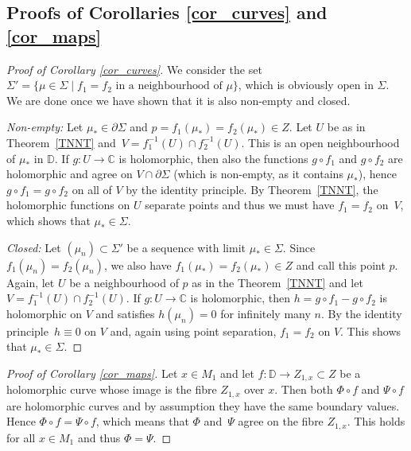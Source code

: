 \documentclass[pdftex]{sigma}
\numberwithin{equation}{section}
\theoremstyle{definition}
\newcommand{\C}{\mathbb{C}} %
\newcommand{\DD}{\mathbb{D}} %
\newcommand{\1}{{\bf 1}}
\begin{document}
\subsection[Proofs of Corollaries 1.5 and 1.6]{Proofs of Corollaries \ref{cor_curves} and \ref{cor_maps}}

\begin{proof}[Proof of Corollary \ref{cor_curves}]
	We consider the set $\Sigma'=\{\mu \in \Sigma\mid f_1 =f_2 \text{ in a neighbourhood of } \mu\}$,
which is obviously open in $\Sigma$. We are done once we have shown that it is also non-empty and closed.

{\it Non-empty:} Let $\mu_* \in \partial \Sigma$ and $p=f_1(\mu_*)=f_2(\mu_*)\in Z$. Let $U$ be as in Theorem~\ref{TNNT} and~${V=f_1^{-1}(U)\cap f_2^{-1}(U)}$. This is an open neighbourhood of $\mu_*$ in $\DD$. If $g\colon U\to \C$ is holomorphic, then also the functions $g\circ f_1$ and $g\circ f_2$ are holomorphic and agree on $V\cap \partial \Sigma$ (which is non-empty, as it contains $\mu_*$), hence $g\circ f_1 = g\circ f_2$ on all of $V$ by the identity principle. By Theorem~\ref{TNNT}, the holomorphic functions on $U$ separate points and thus we must have $f_1=f_2$ on~$V$, which shows that $\mu_*\in \Sigma$.

{\it Closed:} Let $(\mu_n)\subset \Sigma'$ be a sequence with limit $\mu_*\in \Sigma$. Since $f_1(\mu_n)=f_2(\mu_n)$, we also have $f_1(\mu_*)=f_2(\mu_*)\in Z$ and call this point $p$. Again, let $U$ be a neighbourhood of $p$ as in the Theorem~\ref{TNNT} and let $V=f_1^{-1}(U)\cap f_2^{-1}(U)$. If $g\colon U\to \C$ is holomorphic, then $h=g\circ f_1-g\circ f_2$ is holomorphic on $V$ and satisfies $h(\mu_n)=0$ for infinitely many $n$. By the identity principle~${h\equiv 0}$ on $V$ and, again using point separation, $f_1=f_2$ on $V$. This shows that $\mu_*\in \Sigma$.
\end{proof}


\begin{proof}[Proof of Corollary \ref{cor_maps}]
	Let $x\in M_1$ and let $f\colon \DD\rightarrow Z_{1,x}\subset Z$ be a holomorphic curve whose image is the fibre $Z_{1,x}$ over $x$. Then both $\Phi\circ f$ and $\Psi\circ f$ are holomorphic curves and by assumption they have the same boundary values. Hence $\Phi\circ f = \Psi\circ f$, which means that $\Phi$ and~$\Psi$ agree on the fibre $Z_{1,x}$. This holds for all $x\in M_1$ and thus $\Phi=\Psi$.
\end{proof}
\end{document}
